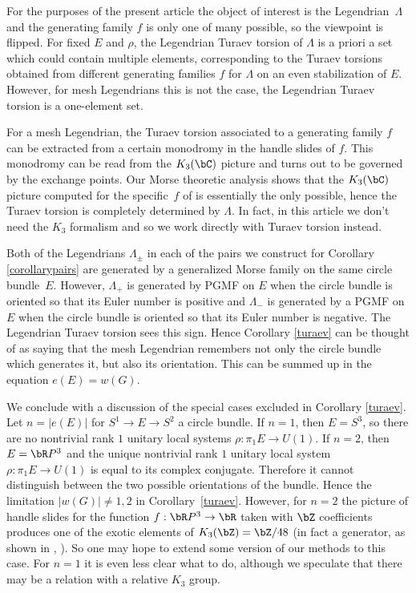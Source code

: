 For the purposes of the present article the object of interest is the Legendrian~$\Lambda$ and the generating family $f$ is only one of many possible, so the viewpoint is flipped. For fixed $E$ and $\rho$, the Legendrian Turaev torsion of $\Lambda$ is a priori a set which could contain multiple elements, corresponding to the Turaev torsions obtained from different generating families $f$ for $\Lambda$ on an even stabilization of $E$. However, for mesh Legendrians this is not the case, the Legendrian Turaev torsion is a one-element set.

For a mesh Legendrian, the Turaev torsion associated to a generating family $f$ can be extracted from a certain monodromy in the handle slides of $f$. This monodromy can be read from the $K_3(\bC)$ picture and turns out to be governed by the exchange points. Our Morse theoretic analysis shows that the $K_3(\bC)$ picture computed for the specific~$f$ of \cite{IK93} is essentially the only possible, hence the Turaev torsion is completely determined by $\Lambda$. In fact, in this article we don't need the $K_3$ formalism and so we work directly with Turaev torsion instead.

\begin{remark} Both of the Legendrians $\Lambda_{\pm}$ in each of the pairs we construct for Corollary \ref{corollarypairs} are generated by a generalized Morse family on the same circle bundle~$E$. However, $\Lambda_+$ is generated by PGMF on $E$ when the circle bundle is oriented so that its Euler number is positive and $\Lambda_-$ is generated by a PGMF on $E$ when the circle bundle is oriented so that its Euler number is negative. The Legendrian Turaev torsion sees this sign. Hence Corollary \ref{turaev} can be thought of as saying that the mesh Legendrian remembers not only the circle bundle which generates it, but also its orientation. This can be summed up in the equation $e(E)=w(G)$.
\end{remark}

We conclude with a discussion of the special cases excluded in Corollary \ref{turaev}. Let $n=|e(E)|$ for $S^1 \to E \to S^2$ a circle bundle. If $n=1$, then $E=S^3$, so there are no nontrivial rank $1$ unitary local systems $\rho: \pi_1E \to U(1)$. If $n=2$, then $E=\bR P^3$ and the unique nontrivial rank $1$ unitary local system $\rho : \pi_1E \to U(1)$ is equal to its complex conjugate. Therefore it cannot distinguish between the two possible orientations of the bundle. Hence the limitation $|w(G)| \neq 1,2$ in Corollary~\ref{turaev}. However, for $n=2$ the picture of handle slides for the function $f:\bR P^3 \to \bR$ taken with $\bZ$ coefficients produces one of the exotic elements of $K_3(\bZ)=\bZ/48$ (in fact a generator, as shown in \cite{IK93a}, \cite{IK93}). So one may hope to extend some version of our methods to this case. For $n=1$ it is even less clear what to do, although we speculate that there may be a relation with a relative $K_3$ group.

